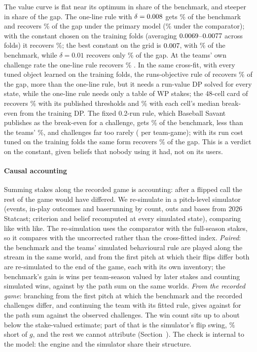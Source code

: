 \documentclass[aoas]{imsart}
\theoremstyle{plain}
\theoremstyle{definition}
\begin{document}
The value curve is flat near its optimum in share of the benchmark, and steeper in share of the gap. The one-line rule
with $\delta=0.008$ gets
\GapRuleShare\% of the benchmark and recovers
\GapRuleGapPct\% \GapRuleGapCI{} of the gap under the primary model (\GapMainRuleGapPct\% under the comparator); with the
constant chosen on the training folds (averaging $0.0069$--$0.0077$ across folds) it recovers
\GapFrozenGapPct\%; the best constant on the grid is $0.007$, with \GapBestShare\% of the benchmark, while $\delta=0.01$
recovers only \GapRuleTenGapPct\% of the gap. At the teams' own challenge rate the one-line rule recovers \GapFMGapPct\%
\GapFMGapCI.
In the same cross-fit, with every tuned object learned on the training folds, the runs-objective rule of
\citet{Namuduri2026runs} recovers \GapRunsGapPct\% of the gap, more than the one-line rule, but it needs a run-value DP
solved for every state, while the one-line rule needs only a table of WP stakes; the 48-cell card of \citet{Arora2026use}
recovers \GapCardPubGapPct\% with its published thresholds and \GapCardRefitGapPct\% with each cell's median
break-even from the training DP. The fixed 0.2-run rule, which Baseball Savant publishes as the break-even for a challenge, gets
\GapSavantShare\% of the benchmark, less than the teams' \GapObsShare\%, and challenges far too rarely (\GapSavantN{} per team-game); with its run cost tuned on the training folds the same
form recovers \GapSavantTunedGapPct\% of the gap. This is a verdict on the constant, given beliefs that nobody using it had, not on its users.

\paragraph{Causal accounting} Summing stakes along the recorded game is accounting: after a flipped call the rest of
the game would have differed. We re-simulate in a pitch-level simulator (events, in-play outcomes and baserunning by
count, outs and bases from 2026 Statcast; criterion and belief recomputed at every simulated state), comparing like
with like. The re-simulation uses the comparator with the full-season stakes, so it compares with the uncorrected
\WinsLostFull{} rather than the cross-fitted index. \emph{Paired}: the benchmark and the teams' simulated behavioural rule are played along the stream in the
same world, and from the first pitch at which their flips differ both are re-simulated to the end of the game, each
with its own inventory; the benchmark's gain is \PairRB{} \PairRBCI{} wins per team-season valued by later stakes and
\PairWin{} counting simulated wins, against \PairPath{} by the path sum on the same worlds. \emph{From the recorded
game}: branching from the first pitch at which the benchmark and the recorded challenges differ, and continuing the
team with its fitted rule, gives \FullRB{} against \FullPathObs{} for the path sum against the observed challenges.
The win count sits up to about \WinMinusRBAbs{} below the stake-valued estimate; part of that is the simulator's flip swing,
\SimGShareRunGap\% short of $g$, and the rest we cannot attribute (Section~). The check is internal
to the model: the engine and the simulator share their structure.
\end{document}
